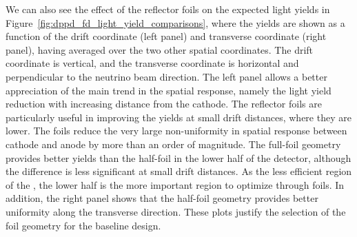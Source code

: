 We can also see the effect of the  reflector foils on the expected light yields in Figure~\ref{fig:dppd_fd_light_yield_comparisons}, where the yields are shown as a function of the drift coordinate (left panel) and transverse coordinate (right panel), having averaged over the two other spatial coordinates. The drift coordinate is vertical, and the transverse coordinate is horizontal and perpendicular to the neutrino beam direction. The left panel allows a better appreciation of the main trend in the spatial response, namely the light yield reduction with increasing distance from the cathode. 
The  reflector foils are particularly useful in improving the yields at small drift distances, where they are lower. The foils reduce the very large non-uniformity in spatial response between cathode and anode by more than an order of magnitude. The full-foil geometry provides better yields than the half-foil in the lower half of the detector, although the  difference is less significant at small drift distances. As the less efficient region of the , the lower half is the more important region to optimize through foils.   In addition, the right panel shows that the half-foil geometry provides better uniformity along the transverse direction. These plots justify the selection of the  foil geometry for the  baseline design. 

